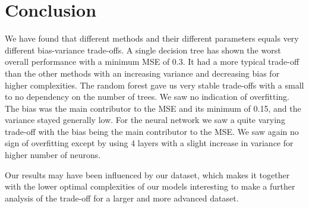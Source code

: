\documentclass[11pt]{article}
\begin{document}
\section{Conclusion}
We have found that different methods and their different parameters equals very different bias-variance trade-offs. A single decision tree has shown the worst overall performance with a minimum MSE of 0.3. It had a more typical trade-off than the other methods with an increasing variance and decreasing bias for higher complexities. The random forest gave us very stable trade-offs with a small to no dependency on the number of trees. We saw no indication of overfitting. The bias was the main contributor to the MSE and its minimum of 0.15, and the variance stayed generally low. For the neural network we saw a quite varying trade-off with the bias being the main contributor to the MSE. We saw again no sign of overfitting except by using 4 layers with a slight increase in variance for higher number of neurons.

Our results may have been influenced by our dataset, which makes it together with the lower optimal complexities of our models interesting to make a further analysis of the trade-off for a larger and more advanced dataset.
\end{document}
